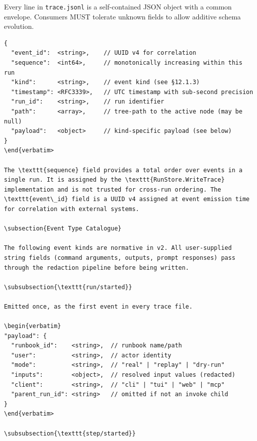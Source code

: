 Every line in \texttt{trace.jsonl} is a self-contained JSON object with a common envelope. Consumers MUST tolerate unknown fields to allow additive schema evolution.

\begin{verbatim}
{
  "event_id":  <string>,    // UUID v4 for correlation
  "sequence":  <int64>,     // monotonically increasing within this run
  "kind":      <string>,    // event kind (see §12.1.3)
  "timestamp": <RFC3339>,   // UTC timestamp with sub-second precision
  "run_id":    <string>,    // run identifier
  "path":      <array>,     // tree-path to the active node (may be null)
  "payload":   <object>     // kind-specific payload (see below)
}
\end{verbatim>

The \texttt{sequence} field provides a total order over events in a single run. It is assigned by the \texttt{RunStore.WriteTrace} implementation and is not trusted for cross-run ordering. The \texttt{event\_id} field is a UUID v4 assigned at event emission time for correlation with external systems.

\subsection{Event Type Catalogue}

The following event kinds are normative in v2. All user-supplied string fields (command arguments, outputs, prompt responses) pass through the redaction pipeline before being written.

\subsubsection{\texttt{run/started}}

Emitted once, as the first event in every trace file.

\begin{verbatim}
"payload": {
  "runbook_id":    <string>,  // runbook name/path
  "user":          <string>,  // actor identity
  "mode":          <string>,  // "real" | "replay" | "dry-run"
  "inputs":        <object>,  // resolved input values (redacted)
  "client":        <string>,  // "cli" | "tui" | "web" | "mcp"
  "parent_run_id": <string>   // omitted if not an invoke child
}
\end{verbatim>

\subsubsection{\texttt{step/started}}


\end{verbatim}
